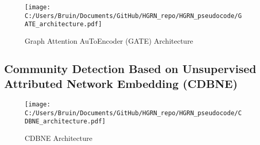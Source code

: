 \documentclass[a4paper,12pt]{article}
\begin{document}
	\begin{figure}[H]
		\centering
		\caption{Graph Attention AuToEncoder (GATE) Architecture}
		\texttt{[image: C:/Users/Bruin/Documents/GitHub/HGRN\_repo/HGRN\_pseudocode/GATE\_architecture.pdf]}
		\label{fig:gate}
	\end{figure}
	
	
	\subsection{Community Detection Based on Unsupervised Attributed Network Embedding (CDBNE)}
	
	
	\begin{figure}[H]
		\centering
		\caption{CDBNE Architecture}
		\texttt{[image: C:/Users/Bruin/Documents/GitHub/HGRN\_repo/HGRN\_pseudocode/CDBNE\_architecture.pdf]}
		\label{fig:gae}
	\end{figure}
	
	
	
	
	
	
	
	
	
	
	
	
	
	
	
	
	
	
	
	
	
	
	
	
	
	
	
	
	
	
	
	
	
	
	
	
	
	
	
	
	
	
	
	
	
	
	
	
	
	
	
	
	
	
	
	
	
	
	
	
	
	
	
	
	
	
	
	
	
	
	
	
	
	
	
	
	
	
	
	
	
	
	
	
	
	
	
	
	
\end{document}
